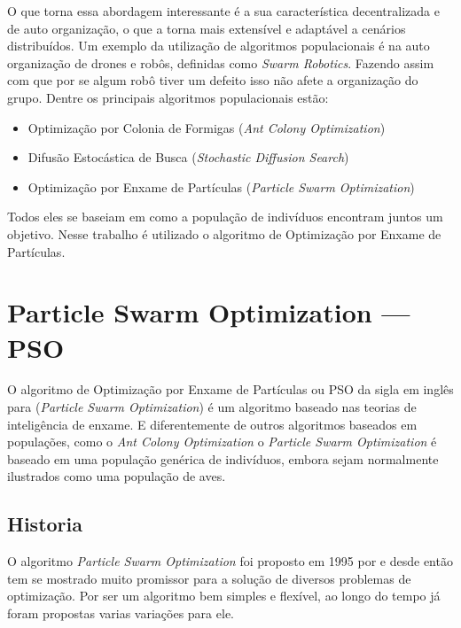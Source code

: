         O que torna essa abordagem interessante é a sua característica decentralizada e de auto organização, o que a torna mais extensível e adaptável a cenários distribuídos. Um exemplo da utilização de algoritmos populacionais é na auto organização de drones e robôs, definidas como \textit{Swarm Robotics}. Fazendo assim com que por se algum robô tiver um defeito isso não afete a organização do grupo.\newline
        Dentre os principais algoritmos populacionais estão:
        \begin{itemize}
            \item Optimização por Colonia de Formigas (\textit{Ant Colony Optimization}) 
            \item Difusão Estocástica de Busca (\textit{Stochastic Diffusion Search})
            \item Optimização por Enxame de Partículas (\textit{Particle Swarm Optimization})
        \end{itemize}
        
        Todos eles se baseiam em como a população de indivíduos encontram juntos um objetivo. Nesse trabalho é utilizado o algoritmo de Optimização por Enxame de Partículas. 


\section{Particle Swarm Optimization — PSO}
        O algoritmo de Optimização por Enxame de Partículas ou PSO da sigla em inglês para (\textit{Particle Swarm Optimization}) é um algoritmo baseado nas teorias de inteligência de enxame. E diferentemente de outros algoritmos baseados em populações, como o \textit{Ant Colony Optimization} o \textit{Particle Swarm Optimization} é baseado em uma população genérica de indivíduos, embora sejam normalmente ilustrados como uma população de aves.


    \subsection{Historia}
        O algoritmo \textit{Particle Swarm Optimization} foi proposto em 1995 por \cite{Kennedy1995} e desde então tem se mostrado muito promissor para a solução de diversos problemas de optimização. Por ser um algoritmo bem simples e flexível, ao longo do tempo já foram propostas varias variações para ele.\hfill\vspace{\onelineskip}
        

